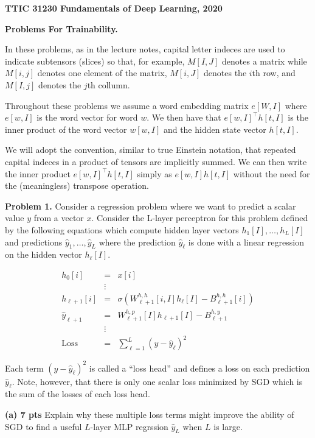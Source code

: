 \documentclass{article}
\begin{document}
\centerline{\bf TTIC 31230 Fundamentals of Deep Learning, 2020}
\medskip
\centerline{\bf Problems For Trainability.}

\bigskip

In these problems, as in the lecture notes, capital letter indeces are used to indicate subtensors (slices) so that, for example,  $M[I,J]$ denotes a matrix
while $M[i,j]$ denotes one element of the matrix, $M[i,J]$ denotes the $i$th row, and $M[I,j]$ denotes the $j$th collumn.

\medskip
Throughout these problems we assume a word embedding matrix $e[W,I]$ where $e[w,I]$ is the word vector for word $w$. We then have that $e[w,I]^\top h[t,I]$
is the inner product of the word vector $w[w,I]$ and the hidden state vector $h[t,I]$.

\medskip
We will adopt the convention, similar to true Einstein notation, that repeated capital indeces in a product of tensors are implicitly summed.  We can then write
the inner product $e[w,I]^\top h[t,I]$ simply as $e[w,I]h[t,I]$ without the need for the (meaningless) transpose operation.

\bigskip
{\bf Problem 1.}  Consider a regression problem where we want to predict a scalar value $y$ from a vector $x$.
Consider the L-layer perceptron for this problem defined by the following equations
which compute hidden layer vectors $h_1[I], \ldots, h_L[I]$ and predictions $\hat{y}_1, \ldots, \hat{y}_L$ where
the prediction $\hat{y}_\ell$ is done with a linear regression on the hidden vector $h_\ell[I]$.

\begin{eqnarray*}
  h_0[i] & = & x[i] \\
  & \vdots & \\
  h_{\ell+1}[i] & = & \sigma(W^{h,h}_{\ell+1}[i,I]h_\ell[I] - B^{h,h}_{\ell+1}[i]) \\
  \hat{y}_{\ell +1} & = & W^{h,p}_{\ell+1}[I]h_{\ell+1}[I]- B^{h,y}_{\ell+1} \\
  & \vdots & \\
  \mathrm{Loss} & = & \sum_{\ell = 1}^L (y - \hat{y}_\ell)^2
\end{eqnarray*}

Each term $(y-\hat{y}_\ell)^2$ is called a ``loss head'' and defines a loss on each prediction $\hat{y}_{\ell}$.
Note, however, that there is only one scalar loss minimized by SGD which is the sum of the losses of each loss head.

\medskip
{\bf (a) 7 pts} Explain why these multiple loss terms might improve the ability of SGD to find a useful $L$-layer MLP regrssion $\hat{y}_L$ when $L$ is large.
\end{document}
